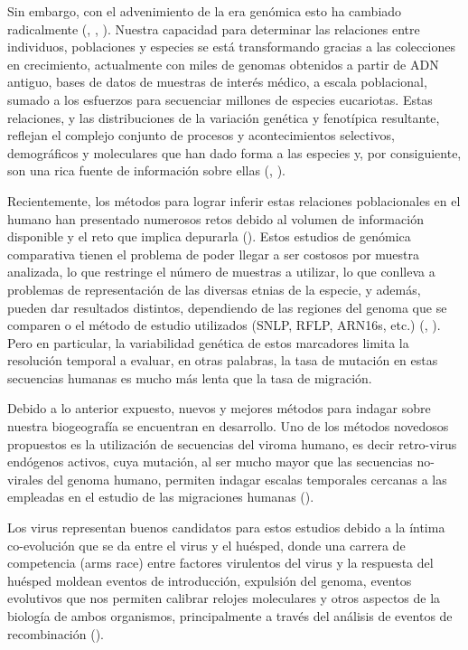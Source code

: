 \documentclass[
  12pt, krantz2,
  spanish,
]{krantz}
\begin{document}
Sin embargo, con el advenimiento de la era genómica esto ha cambiado radicalmente (\citet{kolb2013using}, \citet{wohns2022unified}, \citet{kajan2020virus}). Nuestra capacidad para determinar las relaciones entre individuos, poblaciones y especies se está transformando gracias a las colecciones en crecimiento, actualmente con miles de genomas obtenidos a partir de ADN antiguo, bases de datos de muestras de interés médico, a escala poblacional, sumado a los esfuerzos para secuenciar millones de especies eucariotas. Estas relaciones, y las distribuciones de la variación genética y fenotípica resultante, reflejan el complejo conjunto de procesos y acontecimientos selectivos, demográficos y moleculares que han dado forma a las especies y, por consiguiente, son una rica fuente de información sobre ellas (\citet{kolb2013using}, \citet{wohns2022unified}).

Recientemente, los métodos para lograr inferir estas relaciones poblacionales en el humano han presentado numerosos retos debido al volumen de información disponible y el reto que implica depurarla (\citet{wohns2022unified}). Estos estudios de genómica comparativa tienen el problema de poder llegar a ser costosos por muestra analizada, lo que restringe el número de muestras a utilizar, lo que conlleva a problemas de representación de las diversas etnias de la especie, y además, pueden dar resultados distintos, dependiendo de las regiones del genoma que se comparen o el método de estudio utilizados (SNLP, RFLP, ARN16s, etc.) (\citet{kolb2013using}, \citet{wohns2022unified}). Pero en particular, la variabilidad genética de estos marcadores limita la resolución temporal a evaluar, en otras palabras, la tasa de mutación en estas secuencias humanas es mucho más lenta que la tasa de migración.

Debido a lo anterior expuesto, nuevos y mejores métodos para indagar sobre nuestra biogeografía se encuentran en desarrollo. Uno de los métodos novedosos propuestos es la utilización de secuencias del viroma humano, es decir retro-virus endógenos activos, cuya mutación, al ser mucho mayor que las secuencias no-virales del genoma humano, permiten indagar escalas temporales cercanas a las empleadas en el estudio de las migraciones humanas (\citet{kolb2013using}).

Los virus representan buenos candidatos para estos estudios debido a la íntima co-evolución que se da entre el virus y el huésped, donde una carrera de competencia (arms race) entre factores virulentos del virus y la respuesta del huésped moldean eventos de introducción, expulsión del genoma, eventos evolutivos que nos permiten calibrar relojes moleculares y otros aspectos de la biología de ambos organismos, principalmente a través del análisis de eventos de recombinación (\citet{kolb2013using}).
\end{document}
